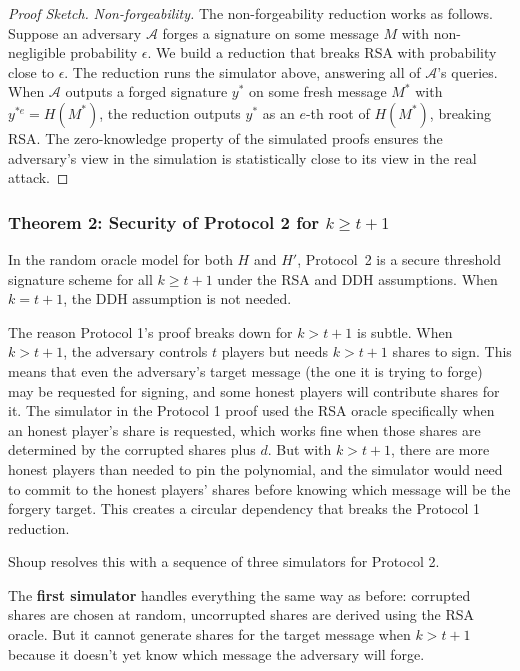\begin{proof}[Proof Sketch]
\medskip
\noindent\textit{Non-forgeability.}
The non-forgeability reduction works as follows. Suppose an adversary $\mathcal{A}$
forges a signature on some message $M$ with non-negligible probability $\epsilon$. We
build a reduction that breaks RSA with probability close to $\epsilon$. The reduction
runs the simulator above, answering all of $\mathcal{A}$'s queries. When $\mathcal{A}$
outputs a forged signature $y^*$ on some fresh message $M^*$ with $y^{*e} = H(M^*)$,
the reduction outputs $y^*$ as an $e$-th root of $H(M^*)$, breaking RSA. The
zero-knowledge property of the simulated proofs ensures the adversary's view in the
simulation is statistically close to its view in the real attack.
\end{proof}

\subsubsection{Theorem 2: Security of Protocol 2 for $k \geq t + 1$}

\begin{theorem}
In the random oracle model for both $H$ and $H'$, Protocol~2 is a secure threshold
signature scheme for all $k \geq t + 1$ under the RSA and DDH assumptions. When
$k = t + 1$, the DDH assumption is not needed.
\end{theorem}

The reason Protocol 1's proof breaks down for $k > t + 1$ is subtle. When $k > t+1$,
the adversary controls $t$ players but needs $k > t+1$ shares to sign. This means that
even the adversary's target message (the one it is trying to forge) may be requested
for signing, and some honest players will contribute shares for it. The simulator in the
Protocol 1 proof used the RSA oracle specifically when an honest player's share is
requested, which works fine when those shares are determined by the corrupted shares plus
$d$. But with $k > t+1$, there are more honest players than needed to pin the polynomial,
and the simulator would need to commit to the honest players' shares before knowing which
message will be the forgery target. This creates a circular dependency that breaks the
Protocol 1 reduction.

Shoup resolves this with a sequence of three simulators for Protocol 2.

The \textbf{first simulator} handles everything the same way as before: corrupted shares
are chosen at random, uncorrupted shares are derived using the RSA oracle. But it cannot
generate shares for the target message when $k > t+1$ because it doesn't yet know which
message the adversary will forge.

